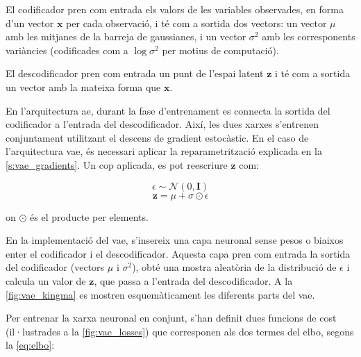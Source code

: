 \documentclass[CAT,BIB]{TFUOC}%
\begin{document}
        El codificador pren com entrada els valors de les variables observades,
        en forma d'un vector $\mathbf{x}$ per cada observació,
        i té com a sortida dos vectors:
        un vector $\mu$ amb les mitjanes de la barreja de gaussianes,
        i un vector $\sigma^2$ amb les corresponents variàncies
        (codificades com a $\log \sigma^2$ per motius de computació).

        El descodificador pren com entrada un punt de l'espai latent $\mathbf{z}$
        i té com a sortida un vector amb la mateixa forma que $\mathbf{x}$.

        En l'arquitectura \gls{ae},
        durant la fase d'entrenament
        es connecta la sortida del codificador a l'entrada del descodificador.
        Així, les dues xarxes s'entrenen conjuntament
        utilitzant el descens de gradient estocàstic.
        En el caso de l'arquitectura \gls{vae},
        és necessari aplicar la reparametrització
        explicada en la \cref{s:vae_gradients}.
        Un cop aplicada, es pot reescriure $\mathbf{z}$ com:

        $$\epsilon \sim \mathcal{N}(0, \mathbf{I})$$
        $$\mathbf{z} = \mu + \sigma \odot \epsilon$$

        on $\odot$ és el producte per elements.

        En la implementació del \gls{vae},
        s'insereix una capa neuronal sense pesos o biaixos
        enter el codificador i el descodificador.
        Aquesta capa pren com entrada la sortida del codificador
        (vectors $\mu$ i $\sigma^2$),
        obté una mostra aleatòria de la distribució de $\epsilon$
        i calcula un valor de $\mathbf{z}$,
        que passa a l'entrada del descodificador.
        A la \cref{fig:vae_kingma} es mostren esquemàticament
        les diferents parts del \gls{vae}.

        Per entrenar la xarxa neuronal en conjunt,
        s'han definit dues funcions de cost
        (il·lustrades a la \cref{fig:vae_losses})
        que corresponen als dos termes del \gls{elbo},
        segons la \cref{eq:elbo}:
\end{document}
